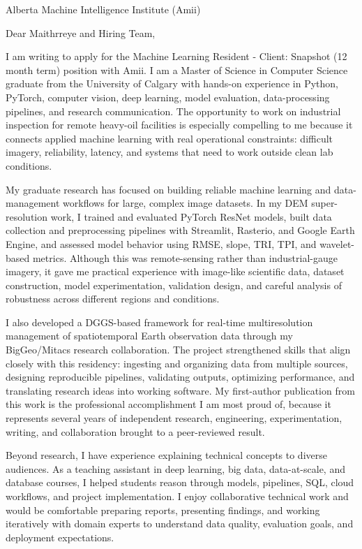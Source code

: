 \documentclass[11pt]{letter}
\begin{document}
\begin{letter}{Alberta Machine Intelligence Institute (Amii)}

\opening{Dear Maithrreye and Hiring Team,}

I am writing to apply for the Machine Learning Resident - Client: Snapshot (12 month term) position with Amii. I am a Master of Science in Computer Science graduate from the University of Calgary with hands-on experience in Python, PyTorch, computer vision, deep learning, model evaluation, data-processing pipelines, and research communication. The opportunity to work on industrial inspection for remote heavy-oil facilities is especially compelling to me because it connects applied machine learning with real operational constraints: difficult imagery, reliability, latency, and systems that need to work outside clean lab conditions.

My graduate research has focused on building reliable machine learning and data-management workflows for large, complex image datasets. In my DEM super-resolution work, I trained and evaluated PyTorch ResNet models, built data collection and preprocessing pipelines with Streamlit, Rasterio, and Google Earth Engine, and assessed model behavior using RMSE, slope, TRI, TPI, and wavelet-based metrics. Although this was remote-sensing rather than industrial-gauge imagery, it gave me practical experience with image-like scientific data, dataset construction, model experimentation, validation design, and careful analysis of robustness across different regions and conditions.

I also developed a DGGS-based framework for real-time multiresolution management of spatiotemporal Earth observation data through my BigGeo/Mitacs research collaboration. The project strengthened skills that align closely with this residency: ingesting and organizing data from multiple sources, designing reproducible pipelines, validating outputs, optimizing performance, and translating research ideas into working software. My first-author publication from this work is the professional accomplishment I am most proud of, because it represents several years of independent research, engineering, experimentation, writing, and collaboration brought to a peer-reviewed result.

Beyond research, I have experience explaining technical concepts to diverse audiences. As a teaching assistant in deep learning, big data, data-at-scale, and database courses, I helped students reason through models, pipelines, SQL, cloud workflows, and project implementation. I enjoy collaborative technical work and would be comfortable preparing reports, presenting findings, and working iteratively with domain experts to understand data quality, evaluation goals, and deployment expectations.


\end{letter}
\end{document}
